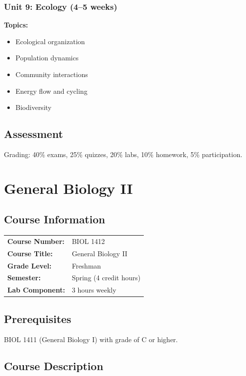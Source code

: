 \documentclass[12pt,oneside]{book}
\begin{document}
\subsection{Unit 9: Ecology (4--5 weeks)}

\textbf{Topics:}
\begin{itemize}
    \item Ecological organization
    \item Population dynamics
    \item Community interactions
    \item Energy flow and cycling
    \item Biodiversity
\end{itemize}

\section{Assessment}

Grading: 40\% exams, 25\% quizzes, 20\% labs, 10\% homework, 5\% participation.


\chapter{General Biology II}

\section{Course Information}

\begin{tabular}{ll}
\textbf{Course Number:} & BIOL 1412 \\
\textbf{Course Title:} & General Biology II \\
\textbf{Grade Level:} & Freshman \\
\textbf{Semester:} & Spring (4 credit hours) \\
\textbf{Lab Component:} & 3 hours weekly \\
\end{tabular}

\section{Prerequisites}

BIOL 1411 (General Biology I) with grade of C or higher.

\section{Course Description}
\end{document}
